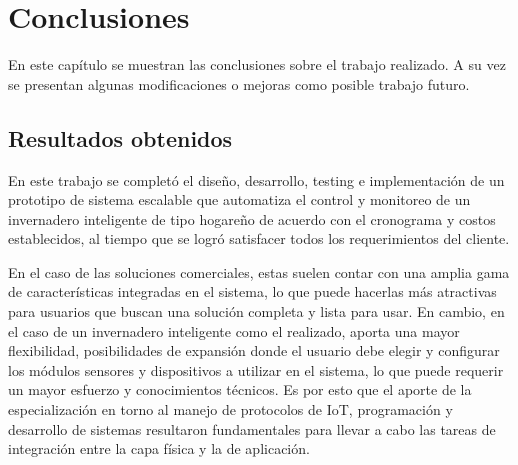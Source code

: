 
\chapter{Conclusiones} %

\label{Chapter5} %





En este capítulo se muestran las conclusiones sobre el trabajo realizado. A su vez
se presentan algunas modificaciones o mejoras como posible trabajo futuro.
\section{Resultados obtenidos }

En este trabajo se completó el diseño, desarrollo, testing e implementación de un
prototipo de sistema escalable que automatiza el control y monitoreo de un invernadero inteligente de tipo hogareño de acuerdo con el cronograma y costos establecidos, al tiempo que se logró satisfacer todos los requerimientos del cliente.


En el caso de las soluciones comerciales, estas suelen contar con una amplia gama de características integradas en el sistema, lo que puede hacerlas más atractivas para usuarios que buscan una solución completa y lista para usar. En cambio, en el caso de un invernadero inteligente como el realizado, aporta una mayor flexibilidad, posibilidades de expansión donde el usuario debe elegir y configurar los módulos sensores y dispositivos a utilizar en el sistema, lo que puede requerir un mayor esfuerzo y conocimientos técnicos. Es por esto que el aporte de la especialización en torno al manejo de protocolos de IoT, programación y desarrollo de sistemas resultaron fundamentales para llevar a cabo las tareas de integración entre la capa física y la de aplicación.

